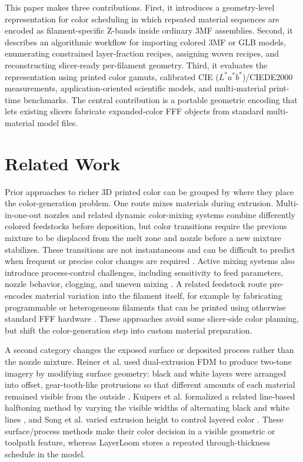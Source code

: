 \documentclass[5p,times,numbers]{elsarticle}
\begin{document}
This paper makes three contributions. First, it introduces a geometry-level representation for color scheduling in which repeated material sequences are encoded as filament-specific Z-bands inside ordinary 3MF assemblies. Second, it describes an algorithmic workflow for importing colored 3MF or GLB models, enumerating constrained layer-fraction recipes, assigning woven recipes, and reconstructing slicer-ready per-filament geometry. Third, it evaluates the representation using printed color gamuts, calibrated CIE ($L^*a^*b^*$)/CIEDE2000 measurements, application-oriented scientific models, and multi-material print-time benchmarks. The central contribution is a portable geometric encoding that lets existing slicers fabricate expanded-color FFF objects from standard multi-material model files.

\section{Related Work}

Prior approaches to richer 3D printed color can be grouped by where they place the color-generation problem. One route mixes materials during extrusion. Multi-in-one-out nozzles and related dynamic color-mixing systems combine differently colored feedstocks before deposition, but color transitions require the previous mixture to be displaced from the melt zone and nozzle before a new mixture stabilizes. These transitions are not instantaneous and can be difficult to predict when frequent or precise color changes are required \citep{hergel2014clean,song2019colored}. Active mixing systems also introduce process-control challenges, including sensitivity to feed parameters, nozzle behavior, clogging, and uneven mixing \citep{li2019experimental}. A related feedstock route pre-encodes material variation into the filament itself, for example by fabricating programmable or heterogeneous filaments that can be printed using otherwise standard FFF hardware \citep{takahashi2020programmable,ahn2024digital}. These approaches avoid some slicer-side color planning, but shift the color-generation step into custom material preparation.

A second category changes the exposed surface or deposited process rather than the nozzle mixture. Reiner et al. used dual-extrusion FDM to produce two-tone imagery by modifying surface geometry: black and white layers were arranged into offset, gear-tooth-like protrusions so that different amounts of each material remained visible from the outside \citep{reiner2014dualcolor}. Kuipers et al. formalized a related line-based halftoning method by varying the visible widths of alternating black and white lines \citep{kuipers2018hatching}, and Song et al. varied extrusion height to control layered color \citep{song2019colored}. These surface/process methods make their color decision in a visible geometric or toolpath feature, whereas LayerLoom stores a repeated through-thickness schedule in the model.
\end{document}
